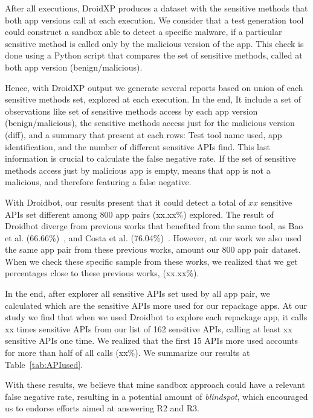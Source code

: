 After all executions, DroidXP produces a dataset with the sensitive methods that both app versions call at each execution. We consider that a test generation tool could construct a sandbox able to detect a specific malware, if a particular sensitive method is called only by the malicious version of the app. This check is done using a Python script that compares the set of sensitive methods, called at both app version (benign/malicious).

Hence, with DroidXP output we generate several reports based on union of each sensitive methods set, explored at each execution. In the end, It include a set of observations like set of sensitive methods access by each app version (benign/malicious), the sensitive methods access just for the malicious version (diff), and a summary that present at each rows: Test tool name used, app identification, and the number of different sensitive APIs find. This last information is crucial to calculate the false negative rate. If the set of sensitive methods access just by malicious app is empty, means that app is not a malicious, and therefore featuring a false negative.

With Droidbot, our results present that it could detect a total of $xx$ sensitive APIs set different among $800$ app pairs (xx.xx\%) explored. The result of Droidbot diverge from previous works that benefited from the same tool, as Bao et al. (66.66\%)~\cite{DBLP:conf/wcre/BaoLL18}, and Costa et al. (76.04\%)~\cite{DBLP:journals/jss/CostaMMSSBNR22}. However, at our work we also used the same app pair from these previous works, amount our $800$ app pair dataset. When we check these specific sample from these works, we realized that we get percentages close to these previous works, (xx.xx\%). 

In the end, after explorer all sensitive APIs set used by all app pair, we calculated which are the sensitive APIs more used for our repackage apps. At our study we find that when we used Droidbot to explore each repackage app, it calls xx times sensitive APIs from our list of 162 sensitive APIs, calling at least xx sensitive APIs one time. We realized that the first 15 APIs more used accounts for more than half of all calls (xx\%). We summarize our results at Table~\ref{tab:APIused}. 

With these results, we believe that mine sandbox approach could have a relevant false negative rate, resulting in a potential amount of \textit{blindspot}, which encouraged us to endorse efforts aimed at answering R2 and R3.

